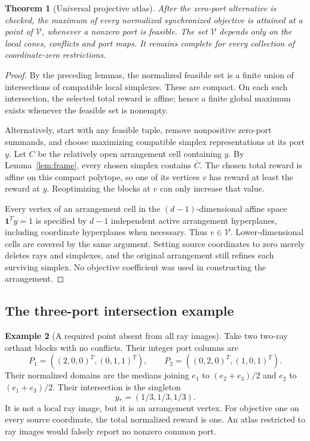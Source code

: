 \documentclass[11pt,a4paper]{article}
\newtheorem{theorem}{Theorem}[section]
\theoremstyle{definition}
\newtheorem{example}[theorem]{Example}
\theoremstyle{remark}
\newcommand{\one}{\mathbf1}\newcommand{\code}[1]{\texttt{\detokenize{#1}}}
\begin{document}
\begin{theorem}[Universal projective atlas]
\label{thm:atlas}
After the zero-port alternative is checked, the maximum of every normalized synchronized objective is attained at a point of $\mathcal V$, whenever a nonzero port is feasible. The set $\mathcal V$ depends only on the local cones, conflicts and port maps. It remains complete for every collection of coordinate-zero restrictions.
\end{theorem}
\begin{proof}
By the preceding lemmas, the normalized feasible set is a finite union of intersections of compatible local simplexes. These are compact. On each such intersection, the selected total reward is affine; hence a finite global maximum exists whenever the feasible set is nonempty.

Alternatively, start with any feasible tuple, remove nonpositive zero-port summands, and choose maximizing compatible simplex representations at its port $y$. Let $C$ be the relatively open arrangement cell containing $y$. By Lemma~\ref{lem:frame}, every chosen simplex contains $\overline C$. The chosen total reward is affine on this compact polytope, so one of its vertices $v$ has reward at least the reward at $y$. Reoptimizing the blocks at $v$ can only increase that value.

Every vertex of an arrangement cell in the $(d-1)$-dimensional affine space $\one^Ty=1$ is specified by $d-1$ independent active arrangement hyperplanes, including coordinate hyperplanes when necessary. Thus $v\in\mathcal V$. Lower-dimensional cells are covered by the same argument. Setting source coordinates to zero merely deletes rays and simplexes, and the original arrangement still refines each surviving simplex. No objective coefficient was used in constructing the arrangement.
\end{proof}

\subsection{The three-port intersection example}
\begin{example}[A required point absent from all ray images]
\label{ex:centroid}
Take two two-ray orthant blocks with no conflicts. Their integer port columns are
\[
 P_1=((2,0,0)^T,(0,1,1)^T),\qquad
 P_2=((0,2,0)^T,(1,0,1)^T).
\]
Their normalized domains are the medians joining $e_1$ to $(e_2+e_3)/2$ and $e_2$ to $(e_1+e_3)/2$. Their intersection is the singleton
\[
 y_*=(1/3,1/3,1/3).
\]
It is not a local ray image, but it is an arrangement vertex. For objective one on every source coordinate, the total normalized reward is one. An atlas restricted to ray images would falsely report no nonzero common port.
\end{example}
\end{document}

